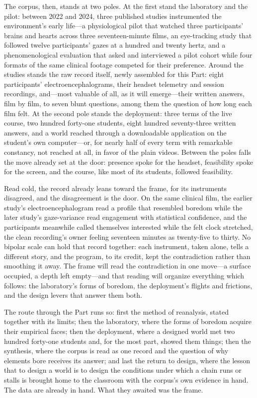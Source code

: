 The corpus, then, stands at two poles. At the first stand the laboratory and the pilot: between 2022 and 2024, three published studies instrumented the environment's early life---a physiological pilot that watched three participants' brains and hearts across three seventeen-minute films, an eye-tracking study that followed twelve participants' gazes at a hundred and twenty hertz, and a phenomenological evaluation that asked and interviewed a pilot cohort while four formats of the same clinical footage competed for their preference. Around the studies stands the raw record itself, newly assembled for this Part: eight participants' electroencephalograms, their headset telemetry and session recordings, and---most valuable of all, as it will emerge---their written answers, film by film, to seven blunt questions, among them the question of how long each film felt. At the second pole stands the deployment: three terms of the live course, two hundred forty-one students, eight hundred seventy-three written answers, and a world reached through a downloadable application on the student's own computer---or, for nearly half of every term with remarkable constancy, not reached at all, in favor of the plain videos. Between the poles falls the move already set at the door: presence spoke for the headset, feasibility spoke for the screen, and the course, like most of its students, followed feasibility.

Read cold, the record already leans toward the frame, for its instruments disagreed, and the disagreement is the door. On the same clinical film, the earlier study's electroencephalogram read a profile that resembled boredom while the later study's gaze-variance read engagement with statistical confidence, and the participants meanwhile called themselves interested while the felt clock stretched, the clean recording's owner feeling seventeen minutes as twenty-five to thirty. No bipolar scale can hold that record together: each instrument, taken alone, tells a different story, and the program, to its credit, kept the contradiction rather than smoothing it away. The frame will read the contradiction in one move---a surface occupied, a depth left empty---and that reading will organize everything which follows: the laboratory's forms of boredom, the deployment's flights and frictions, and the design levers that answer them both.

The route through the Part runs so: first the method of reanalysis, stated together with its limits; then the laboratory, where the forms of boredom acquire their empirical faces; then the deployment, where a designed world met two hundred forty-one students and, for the most part, showed them things; then the synthesis, where the corpus is read as one record and the question of why elements bore receives its answer; and last the return to design, where the lesson that to design a world is to design the conditions under which a chain runs or stalls is brought home to the classroom with the corpus's own evidence in hand. The data are already in hand. What they awaited was the frame.

